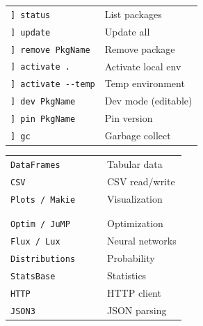 \documentclass[10pt]{extarticle}
\begin{document}
\begin{multicols}{2}
\begin{tabularx}{\linewidth}{@{}l@{\enspace}Y@{}}
\texttt{] status}                    & List packages \\
\texttt{] update}                    & Update all \\
\texttt{] remove PkgName}           & Remove package \\
\texttt{] activate .}               & Activate local env \\
\texttt{] activate -{}-temp}        & Temp environment \\
\texttt{] dev PkgName}              & Dev mode (editable) \\
\texttt{] pin PkgName}              & Pin version \\
\texttt{] gc}                        & Garbage collect \\
\end{tabularx}

\begin{tabularx}{\linewidth}{@{}>{\raggedright\arraybackslash}p{0.55\linewidth}@{\enspace}Y@{}}
\texttt{DataFrames}          & Tabular data \\
\texttt{CSV}                 & CSV read/write \\
\texttt{Plots / Makie}       & Visualization \\
 & \\
 \\
\texttt{Optim / JuMP}        & Optimization \\
\texttt{Flux / Lux}          & Neural networks \\
\texttt{Distributions}       & Probability \\
\texttt{StatsBase}           & Statistics \\
\texttt{HTTP}                & HTTP client \\
\texttt{JSON3}               & JSON parsing \\
\end{tabularx}

\end{multicols}
\end{document}
